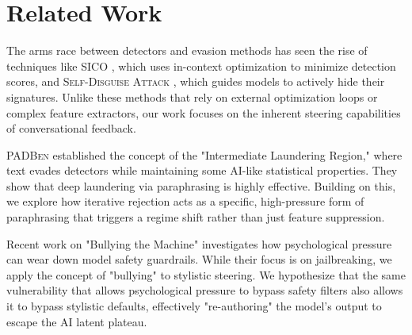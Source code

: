 \section{Related Work}
\label{sec:related_work}

The arms race between detectors and evasion methods has seen the rise of techniques like \textsc{SICO} \cite{lu2023sico}, which uses in-context optimization to minimize detection scores, and \textsc{Self-Disguise Attack} \cite{zhou2024selfdisguise}, which guides models to actively hide their signatures. Unlike these methods that rely on external optimization loops or complex feature extractors, our work focuses on the inherent steering capabilities of conversational feedback.

\textsc{PADBen} \cite{zha2025padben} established the concept of the "Intermediate Laundering Region," where text evades detectors while maintaining some AI-like statistical properties. They show that deep laundering via paraphrasing is highly effective. Building on this, we explore how iterative rejection acts as a specific, high-pressure form of paraphrasing that triggers a regime shift rather than just feature suppression.

Recent work on "Bullying the Machine" \cite{xu2025bullying} investigates how psychological pressure can wear down model safety guardrails. While their focus is on jailbreaking, we apply the concept of "bullying" to stylistic steering. We hypothesize that the same vulnerability that allows psychological pressure to bypass safety filters also allows it to bypass stylistic defaults, effectively "re-authoring" the model's output to escape the AI latent plateau.
